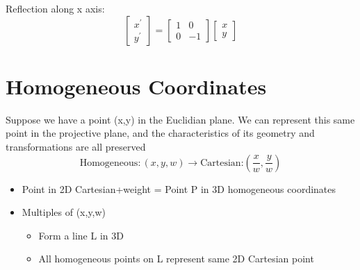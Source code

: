 \documentclass{article}[18pt]
\begin{document}
Reflection along x axis:
$$
\left[\begin{array}{l}{x^{\prime}} \\ {y^{\prime}}\end{array}\right]=\left[\begin{array}{ll}{1} & {0} \\ {0} & {-1}\end{array}\right]\left[\begin{array}{l}{x} \\ {y}\end{array}\right]
$$
\section{Homogeneous Coordinates}
Suppose we have a point (x,y) in the Euclidian plane. We can represent this same point in the projective plane, and the characteristics of its geometry and transformations are all preserved
$$\text{Homogeneous}: (x,y,w) \rightarrow \text{Cartesian:}(\frac{x}{w},\frac{y}{w})$$
\begin{itemize}
	\item Point in 2D Cartesian+weight = Point P in 3D homogeneous coordinates
	\item Multiples of (x,y,w)
	\begin{itemize}
		\item Form a line L in 3D
		\item All homogeneous points on L represent same 2D Cartesian point
	\end{itemize}
\end{itemize}
\end{document}
